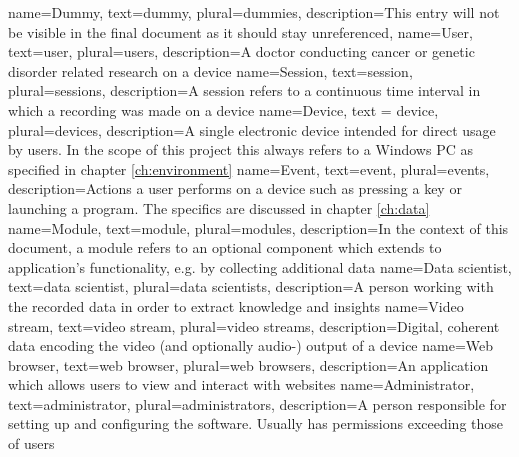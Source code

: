 \label{ch:glossary}

{
	name=Dummy, %
	text=dummy, %
	plural=dummies, %
	description={This entry will not be visible in the final document as it should stay unreferenced}, %
}
{
	name=User,
	text=user,
	plural=users,
	description={A doctor conducting cancer or genetic disorder related research on a \gls{device}}
}
{
	name=Session,
	text=session,
	plural=sessions,
	description={A session refers to a continuous time interval in which a recording was made on a \gls{device}}
}
{
	name=Device,
	text = device,
	plural=devices,
	description={A single electronic device intended for direct usage by \glspl{user}. In the scope of this project this always refers to a Windows PC as specified in chapter \ref{ch:environment}}
}
{
	name=Event,
	text=event,
	plural=events,
	description={Actions a user performs on a \gls{device} such as pressing a key or launching a program. The specifics are discussed in chapter \ref{ch:data}}
}
{
	name=Module,
	text=module,
	plural=modules,
	description={In the context of this document, a module refers to an optional component which extends to application's functionality, e.g. by collecting additional data}
}
{
	name=Data scientist,
	text=data scientist,
	plural=data scientists,
	description={A person working with the recorded data in order to extract knowledge and insights}
}
{
	name=Video stream,
	text=video stream,
	plural=video streams,
	description={Digital, coherent data encoding the video (and optionally audio-) output of a \gls{device}}
}
   {
   	name=Web browser,
   	text=web browser,
   	plural=web browsers,
	description={An application which allows \glspl{user} to view and interact with websites}
}
{
	name=Administrator,
	text=administrator,
	plural=administrators,
	description={A person responsible for setting up and configuring the software. Usually has permissions exceeding those of \glspl{user}}
}